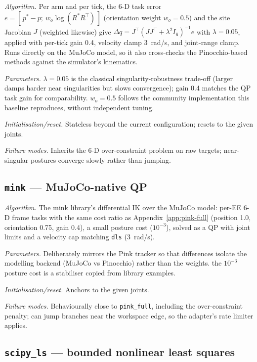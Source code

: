 \emph{Algorithm.} Per arm and per tick, the 6-D task error
\(e = [\,p^\ast - p;\ w_o \log(R^\ast R^\top)\,]\) (orientation weight
\(w_o=0.5\)) and the site Jacobian \(J\) (weighted likewise) give
\(\Delta q = J^\top (J J^\top + \lambda^2 I_6)^{-1} e\) with
\(\lambda = 0.05\), applied with per-tick gain 0.4, velocity clamp
3~rad/s, and joint-range clamp. Runs directly on the MuJoCo model, so it
also cross-checks the Pinocchio-based methods against the simulator's
kinematics.

\emph{Parameters.} \(\lambda=0.05\) is the classical
singularity-robustness trade-off (larger damps harder near
singularities but slows convergence); gain 0.4 matches the QP task gain
for comparability. \unjustified{} \(w_o=0.5\) follows the
community implementation this baseline reproduces, without independent
tuning.

\emph{Initialisation/reset.} Stateless beyond the current configuration;
resets to the given joints.

\emph{Failure modes.} Inherits the 6-D over-constraint problem on raw
targets; near-singular postures converge slowly rather than jumping.

\subsection{\texttt{mink} — MuJoCo-native QP}
\label{app:mink}

\emph{Algorithm.} The mink library's differential IK over the MuJoCo
model: per-EE 6-D frame tasks with the same cost ratio as
Appendix~\ref{app:pink-full} (position 1.0, orientation 0.75, gain 0.4),
a small posture cost (\(10^{-3}\)), solved as a QP with joint limits and
a velocity cap matching \texttt{dls} (3~rad/s).

\emph{Parameters.} Deliberately mirrors the Pink tracker so that
differences isolate the modelling backend (MuJoCo vs Pinocchio) rather
than the weights. \unjustified{} the \(10^{-3}\) posture
cost is a stabiliser copied from library examples.

\emph{Initialisation/reset.} Anchors to the given joints.

\emph{Failure modes.} Behaviourally close to \texttt{pink\_full},
including the over-constraint penalty; can jump branches near the
workspace edge, so the adapter's rate limiter applies.

\subsection{\texttt{scipy\_ls} — bounded nonlinear least squares}
\label{app:scipy-ls}

